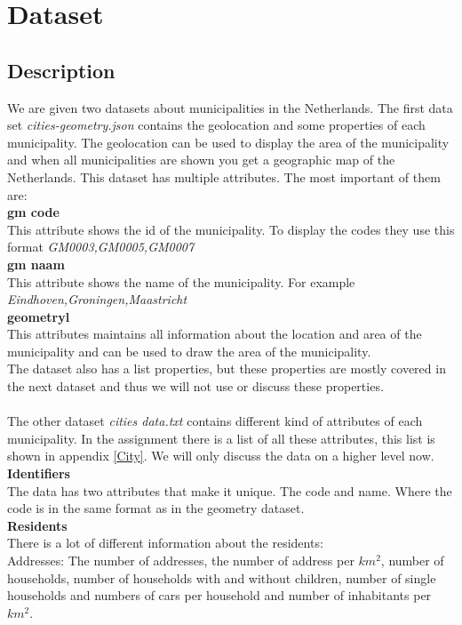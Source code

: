 \section{Dataset}\label{Sec:Dat}
\subsection{Description}
We are given two datasets about municipalities in the Netherlands. The first data set \emph{cities-geometry.json} contains the geolocation and some properties of each municipality. The geolocation can be used to display the area of the municipality and when all municipalities are shown you get a geographic map of the Netherlands. This dataset has multiple attributes. The most important of them are:\\
\textbf{gm code} \\
This attribute shows the id of the municipality. To display the codes they use this format \emph{GM0003,GM0005,GM0007}\\
\textbf{gm naam} \\
This attribute shows the name of the municipality. For example \emph{Eindhoven,Groningen,Maastricht} \\
\textbf{geometryl} \\
This attributes maintains all information about the location and area of the municipality and can be used to draw the area of the municipality. \\
The dataset also has a list properties, but these properties are mostly covered in the next dataset and thus we will not use or discuss these properties. \\ \\
 The other dataset \emph{ cities data.txt}  contains different kind of attributes of each municipality. In the assignment there is a list of all these attributes, this list is shown in appendix \ref{City}. We will only discuss the data on a higher level now. \\
 \textbf{Identifiers} \\
 The data has two attributes that make it unique. The code and name. Where the code  is in the same format as in the geometry dataset. \\
  \textbf{Residents} \\
There is a lot of different information about the residents:\\
Addresses: The number of addresses, the number of address per $km^{2}$, number of households, number of households with and without children, number of single households and numbers of cars per household and number of inhabitants per $km^{2}$. \\
